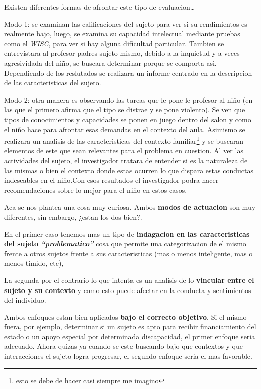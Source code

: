 \documentclass[12pt,a4paper]{article}
\begin{document}
\pagebreak
Existen diferentes formas de afrontar este tipo de evaluacion\ldots

\begin{shaded}
{Modo 1: se examinan las calificaciones del sujeto para ver si su rendimientos es realmente bajo, luego, se examina su capacidad intelectual mediante pruebas como el \textit{WISC}, para ver si hay alguna dificultad particular. Tambien se entrevistara al profesor-padres-sujeto mismo, debido a la inquietud y a veces agresividada del niño, se buscara determinar porque se comporta asi. Dependiendo de los reslutados se realizara un informe centrado en la descripcion de las caracteristicas del sujeto.}
\end{shaded}

\begin{shaded}
{Modo 2: otra manera es observando las tareas que le pone le profesor al niño (en las que el primero afirma que el tipo se distrae y se pone violento). Se ven que tipos de conocimientos y capacidades se ponen en juego dentro del salon y como el niño hace para afrontar esas demandas en el contexto del aula. Asimismo se realizara un analisis de las caracteristicas del contexto familiar\footnote{esto se debe de hacer casi siempre me imagino} y se buscaran elementos de este que sean relevantes para el problema en cuestion. Al ver las actividades del sujeto, el investigador tratara de entender si es la naturaleza de las mismas o bien el contexto donde estas ocurren lo que dispara estas conductas indeseables en el niño.Con esos resultados el investigador podra hacer recomendaciones sobre lo mejor para el niño en estos casos.}
\end{shaded}
 
Aca se nos plantea una cosa muy curiosa. Ambos \textbf{modos de actuacion} son muy diferentes, sin embargo, ¿estan los dos bien?. 

En el primer caso tenemos mas un tipo de \textbf{indagacion en las caracteristicas del sujeto \textit{\enquote{problematico}}} cosa que permite una categorizacion de el mismo frente a otros sujetos frente a sus caracteristicas (mas o menos inteligente, mas o menos timido, etc),

La segunda por el contrario lo que intenta es un analisis de lo \textbf{vincular entre el sujeto y su contexto} y como esto puede afectar en la conducta y sentimientos del individuo.

Ambos enfoques estan bien aplicados \textbf{bajo el correcto objetivo}. Si el mismo fuera, por ejemplo, determinar si un sujeto es apto para recibir financiamiento del estado o un apoyo especial por determinada discapacidad, el primer enfoque seria adecuado. Ahora quizas ya cuando se este buscando bajo que contextos y que interacciones el sujeto logra progresar, el segundo enfoque seria el mas favorable. 
\end{document}

